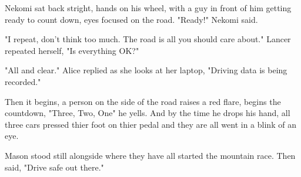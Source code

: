Nekomi sat back stright, hands on his wheel, with a guy in front of him getting ready to count down, eyes focused on the road. "Ready!" Nekomi said.

"I repeat, don't think too much. The road is all you should care about." Lancer repeated herself, "Is everything OK?"

"All and clear." Alice replied as she looks at her laptop, "Driving data is being recorded."

Then it begins, a person on the side of the road raises a red flare, begins the countdown, "Three, Two, One" he yells. And by the time he drops his hand, all three cars pressed thier foot on thier pedal and they are all went in a blink of an eye.

Mason stood still alongside where they have all started the mountain race. Then said, "Drive safe out there."